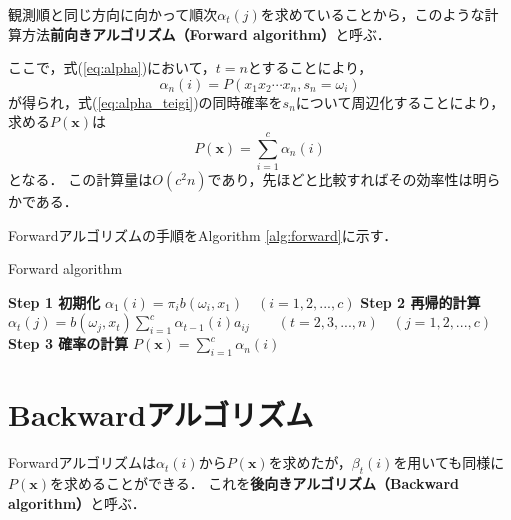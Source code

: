 \documentclass[a4j]{jarticle}
\begin{document}
観測順と同じ方向に向かって順次$\alpha_{t}(j)$を求めていることから，このような計算方法\textbf{前向きアルゴリズム（Forward algorithm）}と呼ぶ\cite{zokupata}．

ここで，式(\ref{eq:alpha})において，$t=n$とすることにより，
\begin{equation}
\alpha_{n}(i) = P(x_{1}x_{2} \cdots x_{n}, s_{n} = \omega_{i}) \label{eq:alpha_teigi}
\end{equation}
が得られ，式(\ref{eq:alpha_teigi})の同時確率を$s_{n}$について周辺化することにより，求める$P(\mathbf{x})$は
\begin{equation}
P(\mathbf{x}) = \sum_{i=1}^{c} \alpha_{n}(i) \label{eq:forward_px}
\end{equation}
となる．
この計算量は$O(c^{2}n)$であり，先ほどと比較すればその効率性は明らかである．

Forwardアルゴリズムの手順をAlgorithm \ref{alg:forward}に示す．

\begin{algorithm}[H]
		\caption{Forward algorithm}
		\label{alg:forward}
		\begin{algorithmic}
			\STATE \textbf{Step 1 初期化}
			\STATE \quad $\alpha_{1}(i)  = \pi_{i} b(\omega_{i}, x_{1}) \quad (i = 1,2,...,c)$
			\STATE \textbf{Step 2 再帰的計算}
			\STATE \quad $\displaystyle \alpha_{t}(j) = b(\omega_{j}, x_{t}) \sum_{i=1}^{c} \alpha_{t-1}(i) a_{ij} \qquad(t=2,3,...,n) \quad (j=1,2,...,c)$
			\STATE \textbf{Step 3 確率の計算}
			\STATE \quad $\displaystyle P(\mathbf{x}) = \sum_{i=1}^{c} \alpha_{n}(i)$
		\end{algorithmic}
\end{algorithm}


\section{Backwardアルゴリズム}
Forwardアルゴリズムは$\alpha_{t}(i)$から$P(\mathbf{x})$を求めたが，$\beta_{t}(i)$を用いても同様に$P(\mathbf{x})$を求めることができる．
これを\textbf{後向きアルゴリズム（Backward algorithm）}と呼ぶ．
\end{document}
